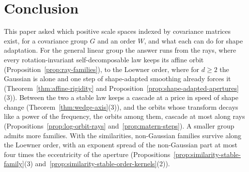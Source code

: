 \section{Conclusion}\label{sec:conclusion}

This paper asked which positive scale spaces indexed by covariance matrices exist, for a covariance
group $G$ and an order $W$, and what each can do for shape adaptation. For the general linear group
the answer runs from the rays, where every rotation-invariant self-decomposable law keeps its affine
orbit (Proposition~\ref{prop:ray-families}), to the Loewner order, where for $d \ge 2$ the Gaussian is
alone and one step of shape-adapted smoothing already forces it (Theorem~\ref{thm:affine-rigidity} and
Proposition~\ref{prop:shape-adapted-apertures}(3)). Between the two a stable law keeps a cascade at a
price in speed of shape change (Theorem~\ref{thm:wedge-axis}(3)), and the orbits whose transform decays
like a power of the frequency, the \Matern{} orbits among them, cascade at most along rays
(Propositions~\ref{prop:log-orbit-rays} and~\ref{prop:matern-steps}). A smaller group admits more
families. With the similarities, non-Gaussian families survive along the Loewner order, with an exponent
spread of the non-Gaussian part at most four times the eccentricity of the aperture (Propositions~\ref{prop:similarity-stable-family}(3)
and~\ref{prop:similarity-stable-order-kernels}(2)).

